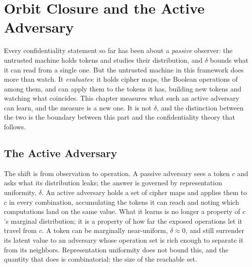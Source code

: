 
\chapter{Orbit Closure and the Active Adversary}
\label{ch:orbit-closure}

Every confidentiality statement so far has been about a \emph{passive}
observer: the untrusted machine holds tokens and studies their distribution,
and $\delta$ bounds what it can read from a single one. But the untrusted
machine in this framework does more than watch. It \emph{evaluates}: it
holds cipher maps, the Boolean operations of  among
them, and can apply them to the tokens it has, building new tokens and
watching what coincides. This chapter measures what such an active adversary
can learn, and the measure is a new one. It is not $\delta$, and the
distinction between the two is the boundary between this part and the
confidentiality theory that follows.

\section{The Active Adversary}
\label{sec:active-adversary}

The shift is from observation to operation. A passive adversary sees a token
$c$ and asks what its distribution leaks; the answer is governed by
representation uniformity, $\delta$. An active adversary holds a set of
cipher maps and applies them to $c$ in every combination, accumulating the
tokens it can reach and noting which computations land on the same value.
What it learns is no longer a property of $c$'s marginal distribution; it is
a property of how far the exposed operations let it travel from $c$. A token
can be marginally near-uniform, $\delta \approx 0$, and still surrender its
latent value to an adversary whose operation set is rich enough to separate
it from its neighbors. Representation uniformity does not bound this, and the
quantity that does is combinatorial: the size of the reachable set.

